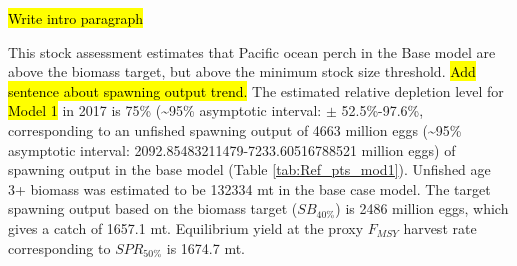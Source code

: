 \documentclass[12pt,]{article}
\begin{document}
\hl{Write intro paragraph}

This stock assessment estimates that Pacific ocean perch in the Base
model are above the biomass target, but above the minimum stock size
threshold. \hl{Add sentence about spawning output trend.} The estimated
relative depletion level for \hl{Model 1} in 2017 is 75\%
(\textasciitilde{}95\% asymptotic interval: \(\pm\) 52.5\%-97.6\%,
corresponding to an unfished spawning output of 4663 million eggs
(\textasciitilde{}95\% asymptotic interval:
2092.85483211479-7233.60516788521 million eggs) of spawning output in
the base model (Table \ref{tab:Ref_pts_mod1}). Unfished age 3+ biomass
was estimated to be 132334 mt in the base case model. The target
spawning output based on the biomass target (\(SB_{40\%}\)) is 2486
million eggs, which gives a catch of 1657.1 mt. Equilibrium yield at the
proxy \(F_{MSY}\) harvest rate corresponding to \(SPR_{50\%}\) is 1674.7
mt.

\FloatBarrier
\end{document}
